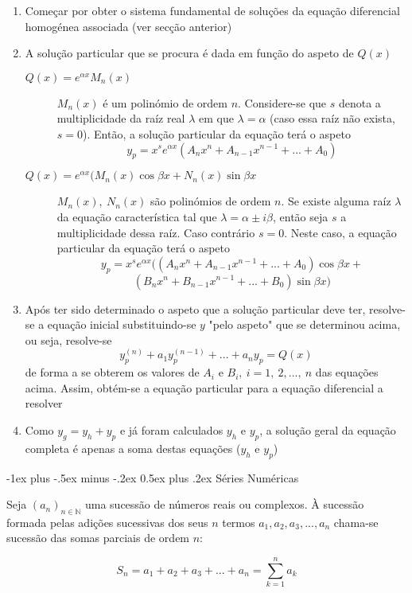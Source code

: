 \documentclass[10pt,landscape]{article}
\makeatletter
\renewcommand{\section}{\@startsection{section}{1}{0mm}%
                                {-1ex plus -.5ex minus -.2ex}%
                                {0.5ex plus .2ex}%
                                {\normalfont\large\bfseries}}
\makeatother
\begin{document}
\begin{multicols}{3}
\begin{enumerate}
\item Começar por obter o sistema fundamental de soluções da equação diferencial homogénea associada (ver secção anterior)
\item A solução particular que se procura é dada em função do aspeto de $Q(x)$
\begin{description}
\item[$Q(x) = e^{\alpha x} M_n(x)$] $M_n(x)$ é um polinómio de ordem $n$. Considere-se que $s$ denota a multiplicidade da raíz real $\lambda$ em que $\lambda = \alpha$ (caso essa raíz não exista, $s = 0$). Então, a solução particular da equação terá o aspeto
$$y_p = x^s e^{\alpha x} (A_nx^n + A_{n-1}x^{n-1} + ... + A_0)$$
\item[$Q(x) = e^{\alpha x}(M_n(x)\cos{\beta x} + N_n(x)\sin{\beta x}$] $M_n(x),\ N_n(x)$ são polinómios de ordem $n$. Se existe alguma raíz $\lambda$ da equação característica tal que $\lambda = \alpha \pm i\beta$, então seja $s$ a multiplicidade dessa raíz. Caso contrário $s = 0$. Neste caso, a equação particular da equação terá o aspeto
$$y_p = x^s e^{\alpha x}((A_nx^n + A_{n-1}x^{n-1} + ... + A_0)\cos{\beta x} +$$
$$(B_nx^n + B_{n-1}x^{n-1} + ... + B_0)\sin{\beta x})$$
\end{description}
\item Após ter sido determinado o aspeto que a solução particular deve ter, resolve-se a equação inicial substituindo-se $y$ "pelo aspeto" que se determinou acima, ou seja, resolve-se
$$y_p^{(n)} + a_1 y_p^{(n-1)} + ... + a_n y_p = Q(x)$$
de forma a se obterem os valores de $A_i$ e $B_i,\ i = 1,\ 2, ...,\ n$ das equações acima. Assim, obtém-se a equação particular para a equação diferencial a resolver
\item Como $y_g = y_h + y_p$ e já foram calculados $y_h$ e $y_p$, a solução geral da equação completa é apenas a soma destas equações ($y_h$ e $y_p$)
\end{enumerate}

\section{Séries Numéricas}

Seja $(a_n)_{n \in \mathbb{N}}$ uma sucessão de números reais ou complexos. À sucessão formada pelas adições sucessivas dos seus $n$ termos $a_1, a_2, a_3, ..., a_n$ chama-se sucessão das somas parciais de ordem $n$:

$$S_n = a_1 + a_2 + a_3 + ... + a_n = \sum\limits_{k=1}^n a_k$$


\end{multicols}
\end{document}
